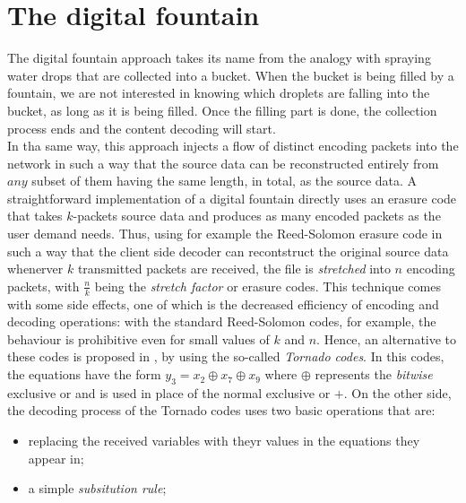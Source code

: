 \section{The digital fountain}
\label{sec:tornado}
The digital fountain approach takes its name from the analogy with spraying water drops that are collected into a bucket. When the bucket is being filled by a fountain, we are not interested in knowing which droplets are falling into the bucket, as long as it is being filled. Once the filling part is done, the collection process ends and the content decoding will start. \cite{Lu}\\
In tha same way, this approach injects a flow of distinct encoding packets into the network in such a way that the source data can be reconstructed entirely from $any$ subset of them having the same length, in total, as the source data.
A straightforward implementation of a digital fountain directly uses an erasure code that takes $k$-packets source data and produces as many encoded packets as the user demand needs. Thus, using for example the Reed-Solomon erasure code in such a way that the client side decoder can recontstruct the original source data whenerver $k$ transmitted packets are received, the file is \textit{stretched} into $n$ encoding packets, with $\frac{n}{k}$ being the \textit{stretch factor} or erasure codes. This technique comes with some side effects, one of which is the decreased efficiency of encoding and decoding operations: with the standard Reed-Solomon codes, for example, the behaviour is prohibitive even for small values of $k$ and $n$. Hence, an alternative to these codes is proposed in \cite{Byers}, by using the so-called \textit{Tornado codes}. In this codes, the equations have the form $y_3 = x_2 \oplus x_7 \oplus x_9$ where $\oplus$ represents the \textit{bitwise} exclusive or and is used in place of the normal exclusive or $+$. On the other side, the decoding process of the Tornado codes uses two basic operations that are:
\begin{itemize}
  \item replacing the received variables with theyr values in the equations they appear in;
  \item a simple \textit{subsitution rule};
\end{itemize}
